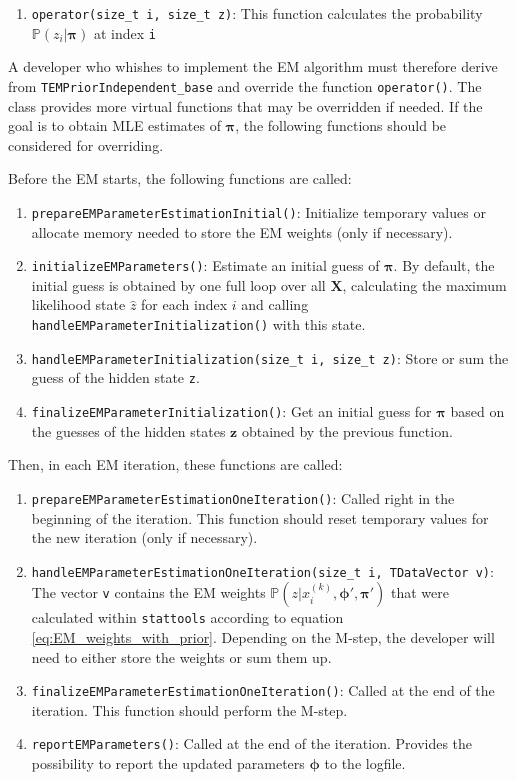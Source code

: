 \documentclass[a4paper,11pt]{article}
\def\X{\boldsymbol{X}}
\def\z{\boldsymbol{z}}
\def\bpi{\boldsymbol{\pi}}
\def\bphi{\boldsymbol{\phi}}
\def\p{\mathbb{P}}
\def\stattools{\texttt{stattools}}
\newcommand{\class}[1]{\texttt{#1}}
\newcommand{\func}[1]{\texttt{#1}}
\newcommand{\pubfunc}[1]{\texttt{#1()}}
\newcommand{\variable}[1]{\texttt{#1}}
\begin{document}
\begin{enumerate}
 \item \func{operator(size\_t i, size\_t z)}: This function calculates the probability $\p(z_i | \bpi)$ at index \variable{i}
\end{enumerate}

A developer who whishes to implement the EM algorithm must therefore derive from \class{TEMPriorIndependent\_base} and override the function \pubfunc{operator}. The class provides more virtual functions that may be overridden if needed. If the goal is to obtain MLE estimates of $\bpi$, the following functions should be considered for overriding.

Before the EM starts, the following functions are called:
\begin{enumerate}
 \item \pubfunc{prepareEMParameterEstimationInitial}: Initialize temporary values or allocate memory needed to store the EM weights (only if necessary).
 \item \pubfunc{initializeEMParameters}: Estimate an initial guess of $\bpi$. By default, the initial guess is obtained by one full loop over all $\X$, calculating the maximum likelihood state $\hat{z}$ for each index $i$ and calling \pubfunc{handleEMParameterInitialization} with this state.
 \item \func{handleEMParameterInitialization(size\_t i, size\_t z)}: Store or sum the guess of the hidden state \variable{z}.
 \item \pubfunc{finalizeEMParameterInitialization}: Get an initial guess for $\bpi$ based on the guesses of the hidden states $\z$ obtained by the previous function.
\end{enumerate}

Then, in each EM iteration, these functions are called:
\begin{enumerate}
 \item \pubfunc{prepareEMParameterEstimationOneIteration}: Called right in the beginning of the iteration. This function should reset temporary values for the new iteration (only if necessary).
 \item \func{handleEMParameterEstimationOneIteration(size\_t i, TDataVector v)}: The vector \variable{v} contains the EM weights $\p(z | x_i^{(k)}, \bphi', \bpi')$ that were calculated within \stattools{} according to equation \eqref{eq:EM_weights_with_prior}. Depending on the M-step, the developer will need to either store the weights or sum them up.
 \item \pubfunc{finalizeEMParameterEstimationOneIteration}: Called at the end of the iteration. This function should perform the M-step.
 \item \pubfunc{reportEMParameters}: Called at the end of the iteration. Provides the possibility to report the updated parameters $\bphi$ to the logfile.
\end{enumerate}
\end{document}
